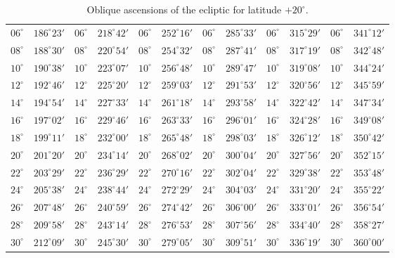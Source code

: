 \begin{table}[!h]
{\begin{tabular}{cc|cc|cc|cc|cc|cc}
$06^\circ$ & $186^\circ23'$ & $06^\circ$ & $218^\circ42'$ & $06^\circ$ & $252^\circ16'$ & $06^\circ$ & $285^\circ33'$ &  $06^\circ$ & $315^\circ29'$ & $06^\circ$ & $341^\circ12'$\\
$08^\circ$ & $188^\circ30'$ & $08^\circ$ & $220^\circ54'$ & $08^\circ$ & $254^\circ32'$ & $08^\circ$ & $287^\circ41'$ &  $08^\circ$ & $317^\circ19'$ & $08^\circ$ & $342^\circ48'$\\
$10^\circ$ & $190^\circ38'$ & $10^\circ$ & $223^\circ07'$ & $10^\circ$ & $256^\circ48'$ & $10^\circ$ & $289^\circ47'$ &  $10^\circ$ & $319^\circ08'$ & $10^\circ$ & $344^\circ24'$\\
$12^\circ$ & $192^\circ46'$ & $12^\circ$ & $225^\circ20'$ & $12^\circ$ & $259^\circ03'$ & $12^\circ$ & $291^\circ53'$ &  $12^\circ$ & $320^\circ56'$ & $12^\circ$ & $345^\circ59'$\\
$14^\circ$ & $194^\circ54'$ & $14^\circ$ & $227^\circ33'$ & $14^\circ$ & $261^\circ18'$ & $14^\circ$ & $293^\circ58'$ &  $14^\circ$ & $322^\circ42'$ & $14^\circ$ & $347^\circ34'$\\
$16^\circ$ & $197^\circ02'$ & $16^\circ$ & $229^\circ46'$ & $16^\circ$ & $263^\circ33'$ & $16^\circ$ & $296^\circ01'$ &  $16^\circ$ & $324^\circ28'$ & $16^\circ$ & $349^\circ08'$\\
$18^\circ$ & $199^\circ11'$ & $18^\circ$ & $232^\circ00'$ & $18^\circ$ & $265^\circ48'$ & $18^\circ$ & $298^\circ03'$ &  $18^\circ$ & $326^\circ12'$ & $18^\circ$ & $350^\circ42'$\\
$20^\circ$ & $201^\circ20'$ & $20^\circ$ & $234^\circ14'$ & $20^\circ$ & $268^\circ02'$ & $20^\circ$ & $300^\circ04'$ &  $20^\circ$ & $327^\circ56'$ & $20^\circ$ & $352^\circ15'$\\
$22^\circ$ & $203^\circ29'$ & $22^\circ$ & $236^\circ29'$ & $22^\circ$ & $270^\circ16'$ & $22^\circ$ & $302^\circ04'$ &  $22^\circ$ & $329^\circ38'$ & $22^\circ$ & $353^\circ48'$\\
$24^\circ$ & $205^\circ38'$ & $24^\circ$ & $238^\circ44'$ & $24^\circ$ & $272^\circ29'$ & $24^\circ$ & $304^\circ03'$ &  $24^\circ$ & $331^\circ20'$ & $24^\circ$ & $355^\circ22'$\\
$26^\circ$ & $207^\circ48'$ & $26^\circ$ & $240^\circ59'$ & $26^\circ$ & $274^\circ42'$ & $26^\circ$ & $306^\circ00'$ &  $26^\circ$ & $333^\circ01'$ & $26^\circ$ & $356^\circ54'$\\
$28^\circ$ & $209^\circ58'$ & $28^\circ$ & $243^\circ14'$ & $28^\circ$ & $276^\circ53'$ & $28^\circ$ & $307^\circ56'$ &  $28^\circ$ & $334^\circ40'$ & $28^\circ$ & $358^\circ27'$\\
$30^\circ$ & $212^\circ09'$ & $30^\circ$ & $245^\circ30'$ & $30^\circ$ & $279^\circ05'$ & $30^\circ$ & $309^\circ51'$ &  $30^\circ$ & $336^\circ19'$ & $30^\circ$ & $360^\circ00'$\\
\end{tabular}}
\caption{Oblique ascensions of the ecliptic for latitude $+20^\circ$.}
\end{table}

